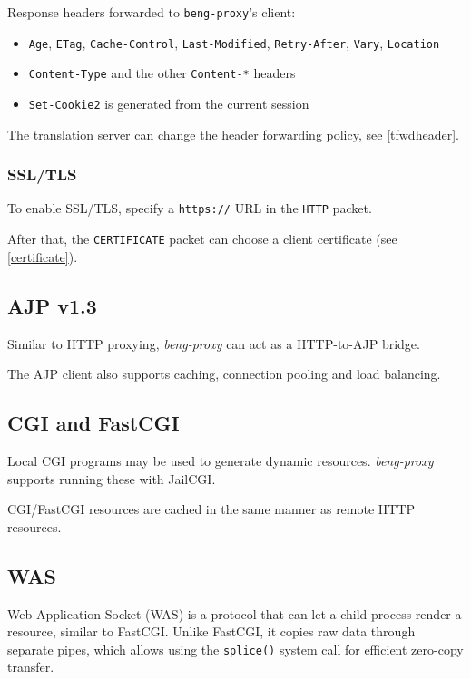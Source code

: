 \documentclass[a4paper,12pt]{article}
\begin{document}
Response headers forwarded to \texttt{beng-proxy}'s client:

\begin{itemize}
\item \texttt{Age}, \texttt{ETag}, \texttt{Cache-Control},
  \texttt{Last-Modified}, \texttt{Retry-After}, \texttt{Vary},
  \texttt{Location}
\item \texttt{Content-Type} and the other \texttt{Content-*} headers
\item \texttt{Set-Cookie2} is generated from the current session
\end{itemize}

The translation server can change the header forwarding policy, see
\ref{tfwdheader}.

\subsubsection{SSL/TLS}

To enable SSL/TLS, specify a \texttt{https://} URL in the \verb|HTTP|
packet.

After that, the \verb|CERTIFICATE| packet can choose a client
certificate (see \ref{certificate}).

\subsection{AJP v1.3}
\label{ajp}

Similar to HTTP proxying, \emph{beng-proxy} can act as a HTTP-to-AJP
bridge.

The AJP client also supports caching, connection pooling and load
balancing.

\subsection{CGI and FastCGI}
\label{cgi}

Local CGI programs may be used to generate dynamic resources.
\emph{beng-proxy} supports running these with JailCGI.

CGI/FastCGI resources are cached in the same manner as remote HTTP
resources.

\subsection{WAS}
\label{was}

Web Application Socket (WAS) is a protocol that can let a child process
render a resource, similar to FastCGI.  Unlike FastCGI, it copies raw
data through separate pipes, which allows using the \texttt{splice()}
system call for efficient zero-copy transfer.
\end{document}
